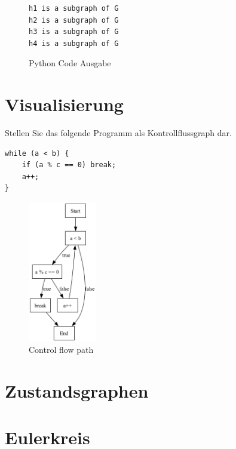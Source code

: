 \documentclass[a4paper,11pt]{report}
\begin{document}
\begin{figure}
    \centering
    \begin{verbatim}
h1 is a subgraph of G
h2 is a subgraph of G
h3 is a subgraph of G
h4 is a subgraph of G
    \end{verbatim}
    \caption{Python Code Ausgabe}
    \label{fig:is_subgraph_output}
\end{figure}

\newpage

\chapter{Visualisierung}

Stellen Sie das folgende Programm als Kontrollflussgraph dar. 

\begin{verbatim}
while (a < b) {
    if (a % c == 0) break;
    a++;
}
\end{verbatim}

\begin{figure}[htbp]
    \centering
    \includegraphics[width=3cm]{notebook/assets/aufgabe_05_graph.png}
    \caption{Control flow path}
    \label{fig:program_graph}
\end{figure}


\newpage

\chapter{Zustandsgraphen}



\newpage

\chapter{Eulerkreis}
\end{document}
